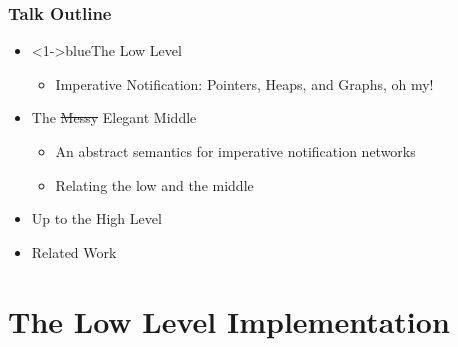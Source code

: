 \documentclass[svgnames]{beamer}
\newcommand{\blue}[2]{{\color<{#1}>{blue}{#2}}}
\begin{document}
\begin{frame}
  \frametitle{Talk Outline}
  \begin{itemize}
      
    \item \blue{1-}{The Low Level}
      \begin{itemize}
        \item Imperative Notification: Pointers, Heaps, and Graphs, oh my!
      \end{itemize}

    \item The \sout{Messy} Elegant Middle
      \begin{itemize}
        \item An abstract semantics for imperative notification networks
        \item Relating the low and the middle
      \end{itemize}
    \item Up to the High Level    \item Related Work
  \end{itemize}
\end{frame}

\section{The Low Level Implementation}

% 
% 
\end{document}
